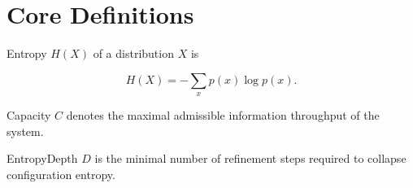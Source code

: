 \chapter{Core Definitions}

\begin{definition}[Entropy]
Entropy \(H(X)\) of a distribution \(X\) is

\[
H(X) = -\sum_x p(x)\log p(x).
\]
\end{definition}

\begin{definition}[Capacity]
Capacity \(C\) denotes the maximal admissible information throughput of the system.
\end{definition}

\begin{definition}[EntropyDepth]
EntropyDepth \(D\) is the minimal number of refinement steps required to collapse configuration entropy.
\end{definition}
